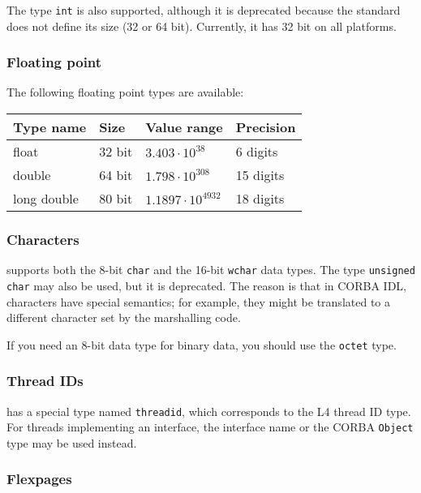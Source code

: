 The type \texttt{int} is also supported, although it is deprecated
because the standard does not define its size (32 or 64 bit). Currently,
it has 32 bit on all platforms.

\subsubsection{Floating point}

The following floating point types are available:

\begin{center}\begin{tabular}{|l|l|l|l|}
\hline
Type name	& Size		& Value range		& Precision 	\\
\hline
float		& 32 bit	& $3.403\cdot 10^{38}$ 	& 6 digits	\\
double		& 64 bit	& $1.798\cdot 10^{308}$	& 15 digits	\\
long double	& 80 bit	& $1.1897\cdot 10^{4932}$ & 18 digits	\\
\hline
\end{tabular}\end{center}

\subsubsection{Characters}

\IDL supports both the 8-bit \texttt{char} and the 16-bit \texttt{wchar}
data types. The type \texttt{unsigned char} may also be used, but it is
deprecated. The reason is that in CORBA IDL, characters have special
semantics; for example, they might be translated to a different character
set by the marshalling code.

If you need an 8-bit data type for binary data, you should use
the \texttt{octet} type.

\subsubsection{Thread IDs}

\IDL has a special type named \texttt{threadid}, which corresponds to the
L4 thread ID type. For threads implementing an \IDL interface, the
interface name or the CORBA \texttt{Object} type may be used instead.

\subsubsection{Flexpages}

